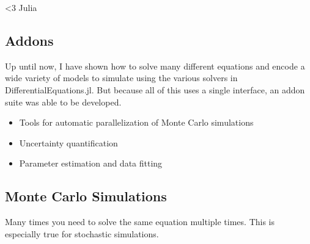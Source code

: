 \documentclass[11pt]{article}
\begin{document}
\textless{}3 Julia

    \subsection{Addons}\label{addons}

Up until now, I have shown how to solve many different equations and
encode a wide variety of models to simulate using the various solvers in
DifferentialEquations.jl. But because all of this uses a single
interface, an addon suite was able to be developed.

\begin{itemize}
\itemsep1pt\parskip0pt
\item
  Tools for automatic parallelization of Monte Carlo simulations
\item
  Uncertainty quantification
\item
  Parameter estimation and data fitting
\end{itemize}

    \subsection{Monte Carlo Simulations}\label{monte-carlo-simulations}

Many times you need to solve the same equation multiple times. This is
especially true for stochastic simulations.
\end{document}
